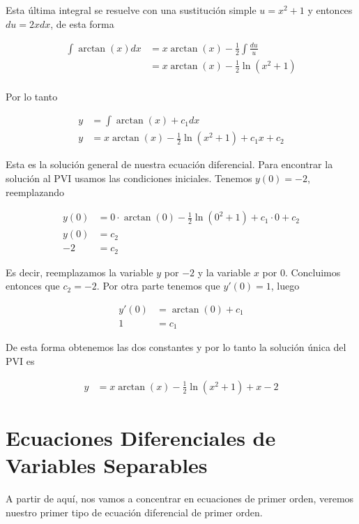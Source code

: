 \documentclass{article}
\theoremstyle{plain}
\theoremstyle{definition}
\begin{document}
Esta última integral se resuelve con una sustitución simple $u=x^2+1$ y entonces $du=2xdx$, de esta forma

\begin{align*}
   \int \arctan(x) dx &= x\arctan(x) - \frac{1}{2}\int \frac{du}{u}\\
   &= x\arctan(x) - \frac{1}{2}\ln(x^2+1)\\
\end{align*}

Por lo tanto


\begin{align*}
    y  &= \int \arctan(x) +c_1 dx \\
    y &= x\arctan(x) - \frac{1}{2}\ln(x^2+1) +c_1x+c_2
\end{align*}

Esta es la solución general de nuestra ecuación diferencial. Para encontrar la solución al PVI usamos las condiciones iniciales. Tenemos $y(0)=-2$, reemplazando

\begin{align*}
    y(0) &= 0 \cdot \arctan(0) - \frac{1}{2}\ln(0^2+1) +c_1 \cdot 0+c_2 \\
   y(0) &= c_2 \\
   -2 &=c_2
\end{align*}

Es decir, reemplazamos la variable $y$ por $-2$ y la variable $x$ por $0$. Concluimos entonces que $c_2= -2$. Por otra parte tenemos que $y'(0)=1$, luego

\begin{align}
    y'(0) &= \arctan(0)+c_1 \\
    1 &=c_1
\end{align}

De esta forma obtenemos las dos constantes y por lo tanto la solución única del PVI es

\begin{align*}
    y &= x\arctan(x) - \frac{1}{2}\ln(x^2+1) +x-2
\end{align*}



\section{Ecuaciones Diferenciales de Variables Separables}


A partir de aquí, nos vamos a concentrar en ecuaciones de primer orden, veremos nuestro primer tipo de ecuación diferencial de primer orden. \\
\end{document}
